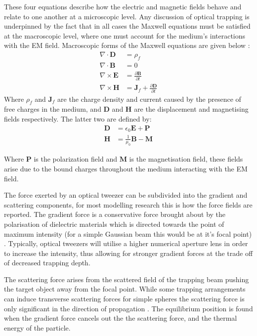 These four equations describe how the electric and magnetic fields 
behave and relate to one another at a microscopic level. Any 
discussion of optical trapping is underpinned by the fact that in 
all cases the Maxwell equations must be satisfied at the macroscopic 
level, where one must account for the medium's interactions with the 
EM field. Macroscopic forms of the Maxwell equations are given below
\cite{Jackson_1975}:
\begin{align}
	\nabla \cdot \mathbf{D}
	&= \rho_f
	\\
	\nabla \cdot \mathbf{B}
	&= 0
	\\
	\nabla \times \mathbf{E}
	&= \frac{\partial \mathbf{B}}{\partial t}
	\\
	\nabla \times \mathbf{H}
	&= \mathbf{J}_f +\frac{\partial \mathbf{D}}{\partial t}  
\end{align}
Where $\rho_f$ and $\mathbf{J}_f$ are the charge density and 
current caused by the presence of free charges in the medium, 
and $\mathbf{D}$ and $\mathbf{H}$ are the displacement and 
magnetising fields respectively. The latter two are defined 
by:
\begin{align}
	\mathbf{D} &= \epsilon_0\mathbf{E}+\mathbf{P} 
	\\ 
	\mathbf{H} &= \frac{1}{\mu_0}\mathbf{B}-\mathbf{M}
\end{align}

Where $\mathbf{P}$ is the polarization field and $\mathbf{M}$ 
is the magnetisation field, these fields arise due to the 
bound charges throughout the medium interacting with the EM 
field. 

The force exerted by an optical tweezer can be subdivided into 
the gradient and scattering components, for most modelling 
research this is how the force fields are reported. The gradient 
force is a conservative force brought about by the polarisation 
of dielectric materials which is directed towards the point of 
maximum intensity (for a simple Gaussian beam this would be at 
it's focal point) \cite{YasuhiroHarada1996}. Typically, optical 
tweezers will utilise a higher numerical aperture lens in order 
to increase the intensity, thus allowing for stronger gradient 
forces at the trade off of decreased trapping depth.

The scattering force arises from the scattered field of the 
trapping beam pushing the target object away from the focal 
point. While some trapping arrangements can induce transverse 
scattering forces for simple spheres the scattering force is 
only significant in the direction of propagation \cite{Capitanio2002}.
The equilibrium position is found when the gradient force 
cancels out the the scattering force, and the thermal energy 
of the particle. 

